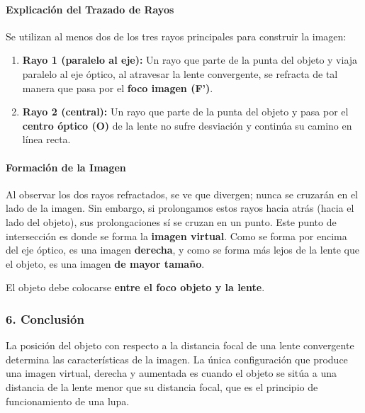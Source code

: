 \paragraph{Explicación del Trazado de Rayos}
Se utilizan al menos dos de los tres rayos principales para construir la imagen:
\begin{enumerate}
    \item \textbf{Rayo 1 (paralelo al eje):} Un rayo que parte de la punta del objeto y viaja paralelo al eje óptico, al atravesar la lente convergente, se refracta de tal manera que pasa por el \textbf{foco imagen (F')}.
    \item \textbf{Rayo 2 (central):} Un rayo que parte de la punta del objeto y pasa por el \textbf{centro óptico (O)} de la lente no sufre desviación y continúa su camino en línea recta.
\end{enumerate}

\paragraph{Formación de la Imagen}
Al observar los dos rayos refractados, se ve que divergen; nunca se cruzarán en el lado de la imagen. Sin embargo, si prolongamos estos rayos hacia atrás (hacia el lado del objeto), sus prolongaciones sí se cruzan en un punto. Este punto de intersección es donde se forma la \textbf{imagen virtual}. Como se forma por encima del eje óptico, es una imagen \textbf{derecha}, y como se forma más lejos de la lente que el objeto, es una imagen \textbf{de mayor tamaño}.

\begin{cajaresultado}
El objeto debe colocarse \textbf{entre el foco objeto y la lente}.
\end{cajaresultado}

\subsubsection*{6. Conclusión}
\begin{cajaconclusion}
La posición del objeto con respecto a la distancia focal de una lente convergente determina las características de la imagen. La única configuración que produce una imagen virtual, derecha y aumentada es cuando el objeto se sitúa a una distancia de la lente menor que su distancia focal, que es el principio de funcionamiento de una lupa.
\end{cajaconclusion}

\newpage

